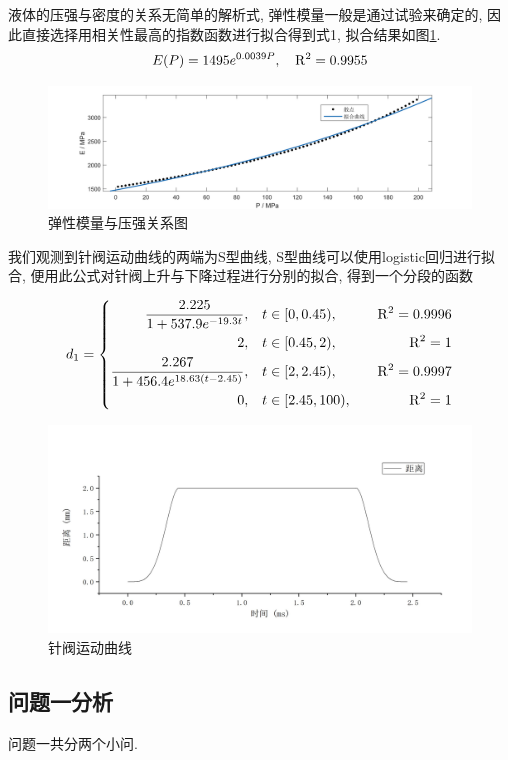 \documentclass{cumcmthesis}
\newcommand{\f}[2]{\frac{#1}{#2}}
\newcommand{\hua}[1]{\left\{\begin{aligned}
    #1
    \end{aligned}\right.}
\begin{document}
液体的压强与密度的关系无简单的解析式, 弹性模量一般是通过试验来确定的, 因此直接选择用相关性最高的指数函数进行拟合得到式1, 拟合结果如图\ref{EP}. 
\begin{equation}
    E(P) = 1495e^{0.0039P} ,\quad \rm{R}^2 = 0.9955 \label{E} 
\end{equation}

\begin{figure}[htbp]
	\centering
	\includegraphics[width=.8\textwidth]{EP.png}
    \caption{弹性模量与压强关系图}
    \label{EP}
\end{figure}

我们观测到针阀运动曲线的两端为S型曲线, S型曲线可以使用logistic回归进行拟合, 便用此公式对针阀上升与下降过程进行分别的拟合, 得到一个分段的函数

\begin{equation}
    d_1 = \hua{
        \f{2.225}{1+537.9e^{-19.3t}}, &\quad t\in[0,0.45),&\quad \rm{R}^2=0.9996\\
        2,&\quad t\in[0.45,2),&\quad \rm{R}^2=1\\
        \f{2.267}{1+456.4e^{18.63(t-2.45)}}, &\quad t\in[2,2.45),&\quad \rm{R}^2=0.9997\\
        0,&\quad t\in[2.45, 100),&\quad \rm{R}^2=1
}\label{d1}
\end{equation}

\begin{figure}[htbp]
	\centering
	\includegraphics[width=.7\textwidth]{quan.jpg}
	\caption{针阀运动曲线}
\end{figure}
\subsection{问题一分析}
问题一共分两个小问. 
\end{document}
